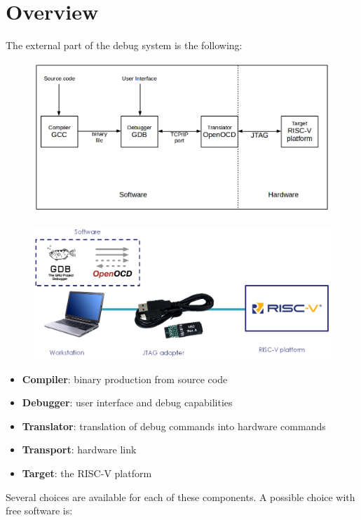\documentclass{article}
\begin{document}
	\newpage
	\section{Overview}
	
	The external part of the debug system is the following:
	
	\begin{figure}[H]
   	\centering
   	\includegraphics[width=.8\textwidth]{debug-system-overview.png}
	\end{figure}
	
	\begin{figure}[H]
   	\centering
   	\includegraphics[width=.8\textwidth]{debug-pictures.png}
	\end{figure}
	
	\vspace{-\topsep}
	\begin{itemize}
	\item \textbf{Compiler}: binary production from source code
	\item \textbf{Debugger}: user interface and debug capabilities
	\item \textbf{Translator}: translation of debug commands into hardware commands
	\item \textbf{Transport}: hardware link
	\item \textbf{Target}: the RISC-V platform
	\end{itemize}
	
	Several choices are available for each of these components. A possible choice with free software is:
	
\end{document}
